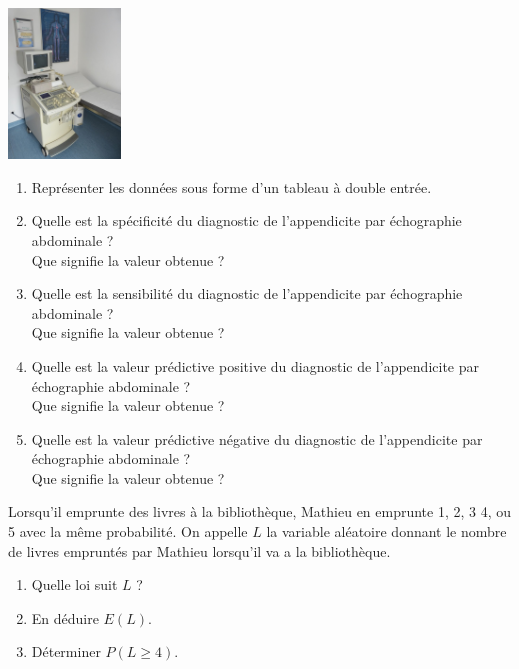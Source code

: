 \documentclass[a4paper,11pt,exos]{nsi} %
\begin{document}
\textcolor{UGLiBlue}{
{\includegraphics[width=3cm]{echographie.jpg}}
\begin{enumerate}
    \item Représenter les données sous forme d'un tableau à double entrée.
    \item Quelle est la spécificité du diagnostic de l'appendicite par échographie abdominale ?\\
    Que signifie la valeur obtenue ?
    \item Quelle est la sensibilité du diagnostic de l'appendicite par échographie abdominale ?\\
    Que signifie la valeur obtenue ?
    \item Quelle est la valeur prédictive positive du diagnostic de l'appendicite par échographie abdominale ?\\
    Que signifie la valeur obtenue ?
    \item Quelle est la valeur prédictive négative du diagnostic de l'appendicite par échographie abdominale ?\\
    Que signifie la valeur obtenue ?
\end{enumerate}}

\exo{}
\textcolor{UGLiBlue}{Lorsqu'il emprunte des livres à la bibliothèque, Mathieu en emprunte 1, 2, 3 4, ou 5 avec la même probabilité. On appelle $L$ la variable aléatoire donnant le nombre de livres empruntés par Mathieu lorsqu'il va a la bibliothèque.
\begin{enumerate}
    \item Quelle loi suit $L$ ?
    \item En déduire $E(L)$.
    \item Déterminer $P(L\geqslant 4)$.
\end{enumerate}}
\end{document}

